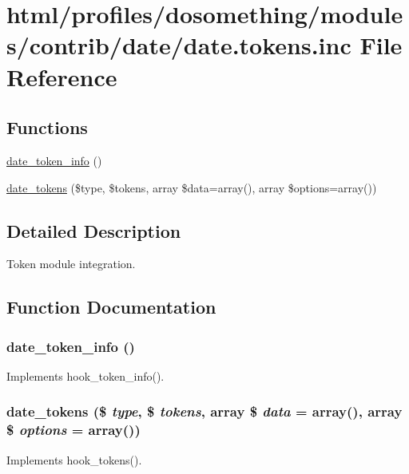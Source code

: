 \hypertarget{date_8tokens_8inc}{
\section{html/profiles/dosomething/modules/contrib/date/date.tokens.inc File Reference}
\label{date_8tokens_8inc}
}
\subsection*{Functions}
\begin{DoxyCompactItemize}
\item 
\hyperlink{date_8tokens_8inc_a6af146f73a63f5519e65c0c4936e9c58}{date\_\-token\_\-info} ()
\item 
\hyperlink{date_8tokens_8inc_a0326bcb262a776cbceb8c7dbcad08f2e}{date\_\-tokens} (\$type, \$tokens, array \$data=array(), array \$options=array())
\end{DoxyCompactItemize}


\subsection{Detailed Description}
Token module integration. 

\subsection{Function Documentation}
\hypertarget{date_8tokens_8inc_a6af146f73a63f5519e65c0c4936e9c58}{
\subsubsection[{date\_\-token\_\-info}]{\setlength{\rightskip}{0pt plus 5cm}date\_\-token\_\-info ()}}
\label{date_8tokens_8inc_a6af146f73a63f5519e65c0c4936e9c58}
Implements hook\_\-token\_\-info(). \hypertarget{date_8tokens_8inc_a0326bcb262a776cbceb8c7dbcad08f2e}{
\subsubsection[{date\_\-tokens}]{\setlength{\rightskip}{0pt plus 5cm}date\_\-tokens (\$ {\em type}, \/  \$ {\em tokens}, \/  array \$ {\em data} = {\ttfamily array()}, \/  array \$ {\em options} = {\ttfamily array()})}}
\label{date_8tokens_8inc_a0326bcb262a776cbceb8c7dbcad08f2e}
Implements hook\_\-tokens(). 
